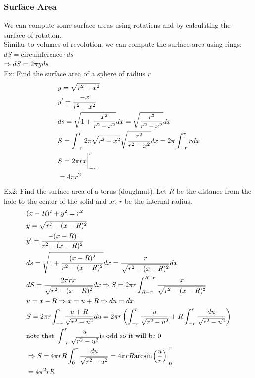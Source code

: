 \documentclass[11pt, fleqn]{article}
\begin{document}
\subsubsection{Surface Area}
We can compute some surface areas using rotations and by calculating the surface of rotation.\\
Similar to volumes of revolution, we can compute the surface area using rings: ${dS=\text{circumference}\cdot ds}$\\
$\Rightarrow dS=2\pi y ds$\\
Ex: Find the surface area of a sphere of radius $r$
\begin{align*}
    &y=\sqrt{r^2-x^2}\\
    &y'=\frac{-x}{r^2-x^2}\\
    &ds=\sqrt{1+\frac{x^2}{r^2-x^2}}dx=\sqrt{\frac{r^2}{r^2-x^2}}dx\\
    &S=\int_{-r}^r2\pi\sqrt{r^2-x^2}\sqrt{\frac{r^2}{r^2-x^2}}dx=2\pi\int_{-r}^r rdx\\
    &S={2\pi rx}\bigg\vert_{-r}^r\\
    &=4\pi r^2
\end{align*}
Ex2: Find the surface area of a torus (doughnut). Let $R$ be the distance from the hole to the center of the solid and let $r$ be the internal radius.
\begin{align*}
    &(x-R)^2+y^2=r^2\\
    &y=\sqrt{r^2-(x-R)^2}\\
    &y'=\frac{-(x-R)}{r^2-(x-R)^2}\\
    &ds=\sqrt{1+\frac{(x-R)^2}{r^2-(x-R)^2}}dx=\frac{r}{\sqrt{r^2-(x-R)^2}}dx\\
    &dS=\frac{2\pi rx}{\sqrt{r^2-(x-R)^2}}dx\Rightarrow S=2\pi r\int_{R-r}^{R+r}\frac{x}{\sqrt{r^2-(x-R)^2}}\\
    &u=x-R\Rightarrow x=u+R\Rightarrow du=dx\\
    &S=2\pi r\int_{-r}^r\frac{u+R}{\sqrt{r^2-u^2}}du=2\pi r\left( \int_{-r}^r\frac{u}{\sqrt{r^2-u^2}}+R\int_{-r}^r\frac{du}{\sqrt{r^2-u^2}} \right)\\
    &\text{note that }\int_{-r}^r\frac{u}{\sqrt{r^2-u^2}}\text{is odd so it will be 0}\\
    &\Rightarrow S=4\pi rR\int_{0}^r\frac{du}{\sqrt{r^2-u^2}}=4\pi rR{\arcsin\left( \frac{u}{r} \right)}\bigg\vert_0^r\\
    &=4\pi^2rR
\end{align*}
\end{document}
